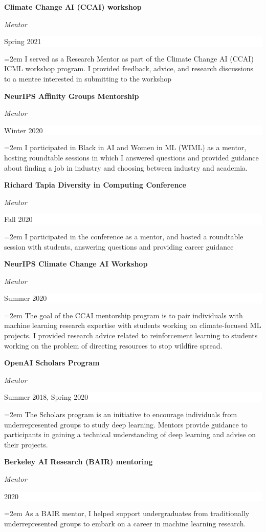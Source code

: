 \documentclass[paper=letter,fontsize=11pt]{scrartcl} %
\newcommand{\sepspace}{\vspace*{1em}}        %
\newcommand{\CourseEntry}[4]{
        \noindent \textbf{#1} \par
        \noindent \textit{#3} \hfill      %
        \colorbox{White}{%
            \parbox{6em}{%
            \hfill\color{Black}#2}} \par  %
        \noindent\hangindent=2em\hangafter=0 \small #4 %
        \normalsize \par}
\begin{document}
\CourseEntry{Climate Change AI (CCAI) workshop}{Spring 2021}{Mentor}
{I served as a Research Mentor as part of the Climate Change AI (CCAI) ICML workshop program. I provided feedback, advice, and research discussions to a mentee interested in submitting to the workshop}
\sepspace

\CourseEntry{NeurIPS Affinity Groups Mentorship}{Winter 2020}{Mentor}
{I participated in Black in AI and Women in ML (WIML) as a mentor, hosting roundtable sessions in which I answered questions and provided guidance about finding a job in industry and choosing between industry and academia.}
\sepspace

\CourseEntry{Richard Tapia Diversity in Computing Conference}{Fall 2020}{Mentor}
{I participated in the conference as a mentor, and hosted a roundtable session with students, answering questions and providing career guidance}
\sepspace

\CourseEntry{NeurIPS Climate Change AI Workshop}{Summer 2020}{Mentor}
{The goal of the CCAI mentorship program is to pair individuals with machine learning research expertise with students working on climate-focused ML projects. I provided research advice related to reinforcement learning to students working on the problem of directing resources to stop wildfire spread.}
\sepspace

\CourseEntry{OpenAI Scholars Program}{Summer 2018, Spring 2020}{Mentor}
{The Scholars program is an initiative to encourage individuals from underrepresented groups to study deep learning. Mentors provide guidance to participants in gaining a technical understanding of deep learning and advise on their projects.}
\sepspace

\CourseEntry{Berkeley AI Research (BAIR) mentoring}{2020}{Mentor}
{As a BAIR mentor, I helped support undergraduates from traditionally underrepresented groups to embark on a career in machine learning research.}
\sepspace




\iffalse
MIT Machine Learning Across Disciplines Challenge

\fi
\end{document}
